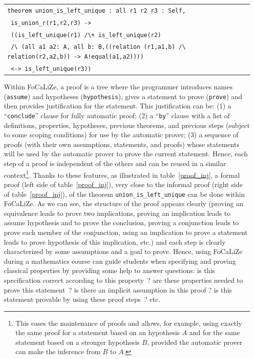 \documentclass[submission,copyright,creativecommons]{eptcs}
\def\focalize{FoCaLiZe \mbox{}}
\begin{document}
\begin{center}
\begin{scriptsize}
\begin{tabular}{|l|}
\hline
{\tt theorem union\_is\_left\_unique : all r1 r2 r3 : Self,}\\
{\tt \hspace{0.1cm} is\_union\_r(r1,r2,r3) ->}\\
{\tt \hspace{0.2cm}  ((is\_left\_unique(r1) \verb+/\+ is\_left\_unique(r2)}\\
{\tt  \hspace{0.2cm}  \verb+/\ (all a1 a2: A, all b: B,((relation (r1,a1,b) /\ relation(r2,a2,b)) -> A!equal(a1,a2))))+}\\
{\tt  \hspace{0.2cm}   <-> is\_left\_unique(r3))}\\
\hline
\end{tabular}
\end{scriptsize}
\end{center}

\noindent
Within FoCaLiZe,
a proof is a tree where the programmer
introduces names ({\footnotesize \tt assume}) and hypotheses ({\footnotesize \tt hypothesis}), gives a statement to
prove ({\footnotesize \tt prove}) and then provides justification for the
statement. This justification can be: (1) a ``{\footnotesize \tt conclude}'' clause for
fully automatic proof; (2) a ``{\footnotesize \tt by}'' clause with a list of
definitions, properties, hypotheses, previous theorems, and previous
steps (subject to some scoping conditions) for use by the automatic
prover; (3) a sequence of proofs (with their own assumptions,
statements, and proofs) whose statements will be used by the automatic
prover to prove the current statement.
Hence, each step of a proof is independent of the others and can be
reused in a similar context\footnote{This eases the maintenance of proofs and
allows, for example, using exactly the same proof for a statement based on an
hypothesis $A$ and for the same statement based on a stronger
hypothesis $B$, provided the automatic prover can make the inference
from $B$ to $A$.}. Thanks to these features, as illustrated in
table~\ref{proof_inj}, a formal proof (left side of table~\ref{proof_inj}), very close to the
informal proof (right side of table~\ref{proof_inj}), of the theorem 
{\footnotesize \tt union\_is\_left\_unique} can be done within
FoCaLiZe.
As we can see, the structure of the proof appears clearly (proving an
equivalence leads to prove two implications, proving an implication
leads to assume hypothesis and to prove the conclusion, proving a
conjunction leads to prove each member of the conjunction, using an
implication to prove a statement leads to prove hypothesis of this
implication, etc.) and each step is clearly characterized by some
assumptions and a goal to prove. 
Hence, using \focalize during a mathematics course can guide students when
specifying  and proving classical properties by providing some help to
answer questions: is this specification correct according to this
property~? are these properties needed to prove this statement~? is there 
an implicit assumption in this proof ? is this statement provable by
using these proof steps~? etc.
\end{document}
